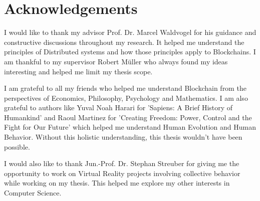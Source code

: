 \chapter{Acknowledgements}
	I would like to thank my advisor Prof. Dr. Marcel Waldvogel for his guidance and constructive discussions throughout my research. It helped me understand the principles of Distributed systems and how those principles apply to Blockchains. I am thankful to my supervisor Robert Müller who always found my ideas interesting and helped me limit my thesis scope.
	
	I am grateful to all my friends who helped me understand Blockchain from the perspectives of Economics, Philosophy, Psychology and Mathematics. I am also grateful to authors like Yuval Noah Harari for 'Sapiens: A Brief History of Humankind' and Raoul Martinez for 'Creating Freedom: Power, Control and the Fight for Our Future' which helped me understand Human Evolution and Human Behavior.  Without this holistic understanding, this thesis wouldn't have been possible.
	
	I would also like to thank Jun.-Prof. Dr. Stephan Streuber for giving me the opportunity to work on Virtual Reality projects involving collective behavior while working on my thesis. This helped me explore my other interests in Computer Science.